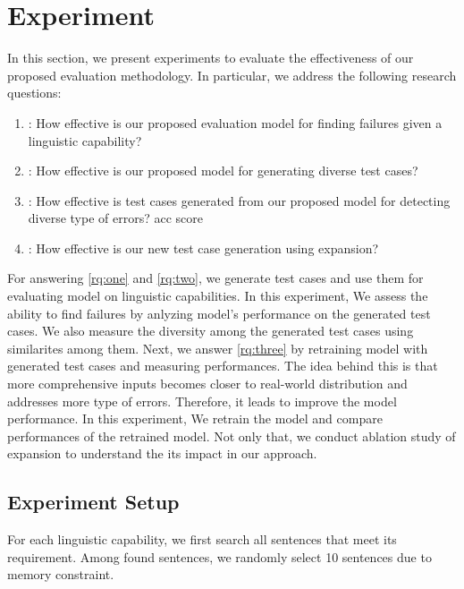 \section{Experiment}
\label{sec:experiment}
%


In this section, we present experiments to evaluate the effectiveness
of our proposed evaluation methodology. In particular, we address the
following research questions:

\begin{enumerate}[label=\textbf{RQ\arabic*}]
\item \label{rq:one}: How effective is our proposed evaluation model
  for finding failures given a linguistic capability?
\item \label{rq:two}: How effective is our proposed model for
  generating diverse test cases? %
\item \label{rq:three}: How effective is test cases generated from our
  proposed model for detecting diverse type of errors? %
  acc score
\item \label{rq:four}: How effective is our new test case generation
  using \cfg expansion? %
\end{enumerate}

For answering \ref{rq:one} and \ref{rq:two}, we generate test cases
and use them for evaluating model on linguistic capabilities. In this
experiment, We assess the ability to find failures by anlyzing model's
performance on the generated test cases. We also measure the diversity
among the generated test cases using similarites among them. Next, we
answer \ref{rq:three} by retraining \sa model with generated test
cases and measuring performances. The idea behind this is that more
comprehensive inputs becomes closer to real-world distribution and
addresses more type of errors.  Therefore, it leads to improve the
model performance. In this experiment, We retrain the model and
compare performances of the retrained model. Not only that, we conduct
ablation study of \cfg expansion to understand the its impact in our
approach.

\subsection{Experiment Setup}
%
%
For each linguistic capability, we first search all sentences that
meet its requirement. Among found sentences, we randomly select 10
sentences due to memory constraint.

